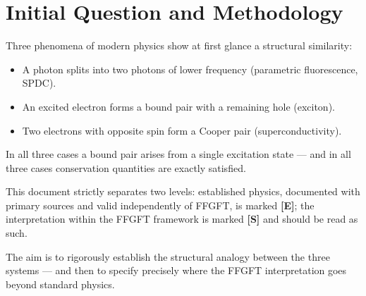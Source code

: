 %

\providecommand{\ket}[1]{\left|#1\right\rangle}
\providecommand{\bra}[1]{\left\langle#1\right|}

\section{Initial Question and Methodology}
\label{sec:initial-question}

Three phenomena of modern physics show at first glance
a structural similarity:

\begin{itemize}
  \item A photon splits into two photons of lower frequency
    (parametric fluorescence, SPDC).
  \item An excited electron forms a bound pair with a remaining
    hole (exciton).
  \item Two electrons with opposite spin form
    a Cooper pair (superconductivity).
\end{itemize}

In all three cases a bound pair arises from a single
excitation state --- and in all three cases
conservation quantities are exactly satisfied.

\begin{important}
This document strictly separates two levels: established physics, documented with primary sources and valid independently of FFGFT, is marked \textbf{[E]}; the interpretation within the FFGFT framework is marked \textbf{[S]} and should be read as such.



The aim is to rigorously establish the structural analogy between the three systems --- and then to specify precisely where the FFGFT interpretation goes beyond standard physics.
\end{important}

